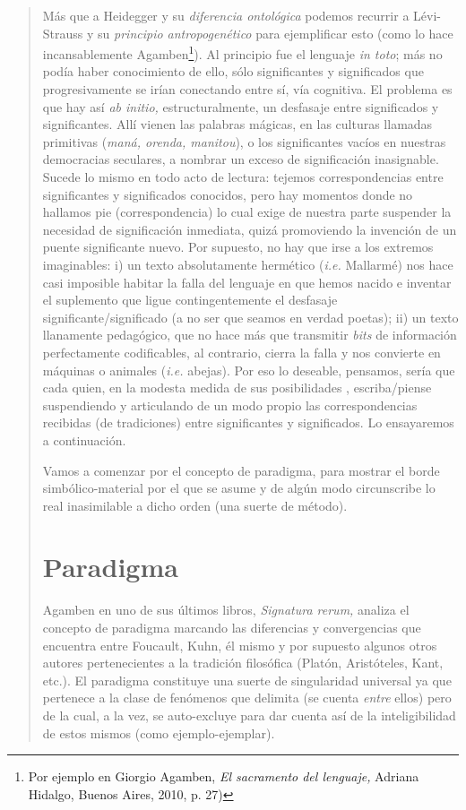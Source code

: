 \begin{quote}
Más que a Heidegger y su \emph{diferencia ontológica} podemos recurrir a Lévi-Strauss y su \emph{principio antropogenético} para ejemplificar esto (como lo hace incansablemente Agamben\footnote{Por ejemplo en Giorgio Agamben, \emph{El sacramento del lenguaje,} Adriana Hidalgo, Buenos Aires, 2010, p. 27)}). Al principio fue el lenguaje \emph{in toto}; más no podía haber conocimiento de ello, sólo significantes y significados que progresivamente se irían conectando entre sí, vía cognitiva. El problema es que hay así \emph{ab initio,} estructuralmente, un desfasaje entre significados y significantes. Allí vienen las palabras mágicas, en las culturas llamadas primitivas (\emph{maná, orenda, manitou}), o los significantes vacíos en nuestras democracias seculares, a nombrar un exceso de significación inasignable. Sucede lo mismo en todo acto de lectura: tejemos correspondencias entre significantes y significados conocidos, pero hay momentos donde no hallamos pie (correspondencia) lo cual exige de nuestra parte suspender la necesidad de significación inmediata, quizá promoviendo la invención de un puente significante nuevo. Por supuesto, no hay que irse a los extremos imaginables: i) un texto absolutamente hermético (\emph{i.e.} Mallarmé) nos hace casi imposible habitar la falla del lenguaje en que hemos nacido e inventar el suplemento que ligue contingentemente el desfasaje significante/significado (a no ser que seamos en verdad poetas); ii) un texto llanamente pedagógico, que no hace más que transmitir \emph{bits} de información perfectamente codificables, al contrario, cierra la falla y nos convierte en máquinas o animales (\emph{i.e.} abejas). Por eso lo deseable, pensamos, sería que cada quien, en la modesta medida de sus posibilidades , escriba/piense suspendiendo y articulando de un modo propio las correspondencias recibidas (de tradiciones) entre significantes y significados. Lo ensayaremos a continuación.

Vamos a comenzar por el concepto de paradigma, para mostrar el borde simbólico-material por el que se asume y de algún modo circunscribe lo real inasimilable a dicho orden (una suerte de método).

\section{Paradigma}

Agamben en uno de sus últimos libros, \emph{Signatura rerum,} analiza el concepto de paradigma marcando las diferencias y convergencias que encuentra entre Foucault, Kuhn, él mismo y por supuesto algunos otros autores pertenecientes a la tradición filosófica (Platón, Aristóteles, Kant, etc.). El paradigma constituye una suerte de singularidad universal ya que pertenece a la clase de fenómenos que delimita (se cuenta \emph{entre} ellos) pero de la cual, a la vez, se auto-excluye para dar cuenta así de la inteligibilidad de estos mismos (como ejemplo-ejemplar).


\end{quote}
